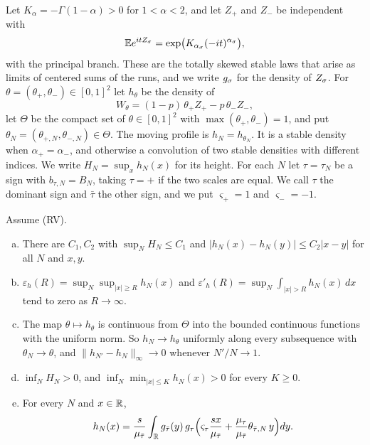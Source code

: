 Let $K_\alpha=-\Gamma(1-\alpha)>0$ for $1<\alpha<2$, and let $Z_\plus$ and
$Z_\minus$ be independent with
\[
 \mathbb{E} e^{itZ_\sigma}=\exp\bigl(K_{\alpha_\sigma}(-it)^{\alpha_\sigma}\bigr),
\]
with the principal branch. These are the totally skewed stable laws that arise
as limits of centered sums of the runs, and we write $g_\sigma$ for the density
of $Z_\sigma$. For $\theta=(\theta_\plus,\theta_\minus)\in[0,1]^2$ let $h_\theta$
be the density of
\begin{equation}\label{eq:profile}
 W_\theta=(1-p)\,\theta_\plus Z_\plus-p\,\theta_\minus Z_\minus ,
\end{equation}
let $\Theta$ be the compact set of $\theta\in[0,1]^2$ with
$\max(\theta_\plus,\theta_\minus)=1$, and put $\theta_N=(\theta_{\plus,N},\theta_{\minus,N})\in\Theta$.
The moving profile is $h_N=h_{\theta_N}$. It is a stable density when
$\alpha_\plus=\alpha_\minus$, and otherwise a convolution of two stable densities
with different indices. We write $H_N=\sup_xh_N(x)$ for its height. For each
$N$ let $\tau=\tau_N$ be a sign with $b_{\tau,N}=B_N$, taking $\tau=\plus$ if
the two scales are equal. We call $\tau$ the dominant sign and $\bar\tau$ the
other sign, and we put $\varsigma_\plus=1$ and $\varsigma_\minus=-1$.

\begin{lemma}\label{lem:profile}
Assume (RV).
\begin{enumerate}[(a)]
\item There are $C_1,C_2$ with $\sup_NH_N\le C_1$ and $|h_N(x)-h_N(y)|\le C_2|x-y|$ for
all $N$ and $x,y$.
\item $\varepsilon_h(R)=\sup_N\sup_{|x|\ge R}h_N(x)$ and
$\varepsilon'_h(R)=\sup_N\int_{|x|>R}h_N(x)\,dx$ tend to zero as $R\to\infty$.
\item The map $\theta\mapsto h_\theta$ is continuous from $\Theta$ into the bounded
continuous functions with the uniform norm. So $h_N\to h_\theta$ uniformly along every
subsequence with $\theta_N\to\theta$, and $\lVert h_{N'}-h_N\rVert_\infty\to0$ whenever
$N'/N\to1$.
\item $\inf_NH_N>0$, and $\inf_N\min_{|x|\le K}h_N(x)>0$ for every $K\ge0$.
\item For every $N$ and $x\in\mathbb{R}$,
\begin{equation}\label{eq:bulk-profile}
 h_N(x)=\frac{s}{\mu_{\bar\tau}}\int_{\mathbb{R}} g_{\bar\tau}(y)\,
 g_\tau\Bigl(\varsigma_\tau\frac{sx}{\mu_{\bar\tau}}+\frac{\mu_\tau}{\mu_{\bar\tau}}\theta_{\bar\tau,N}\,y\Bigr)dy .
\end{equation}
\end{enumerate}
\end{lemma}


